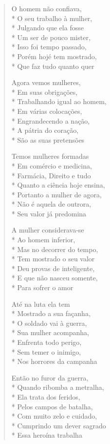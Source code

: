\begin{verse}
O homem não confiava,\\*
O seu trabalho à mulher,\\*
Julgando que ela fosse\\*
Um ser de pouco mister,\\*
Isso foi tempo passado,\\*
Porém hojé tem mostrado,\\*
Que faz tudo quanto quer

Agora vemos mulheres,\\*
Em suas obrigações,\\*
Trabalhando igual ao homem,\\*
Em várias colocações,\\*
Engrandecendo a nação,\\*
A pátria do coração,\\*
São as suas pretensões

Temos mulheres formadas\\*
Em comércio e medicina,\\*
Farmácia, Direito e tudo\\*
Quanto a ciência hoje ensina,\\*
Portanto a mulher de agora,\\*
Não é aquela de outrora,\\*
Seu valor já predomina

A mulher considerava-se\\*
Ao homem inferior,\\*
Mas no decorrer do tempo,\\*
Tem mostrado o seu valor\\*
Deu provas de inteligente,\\*
E que não nasceu somente,\\*
Para sofrer o amor

Até na luta ela tem\\*
Mostrado a sua façanha,\\*
O soldado vai à guerra,\\*
Sua mulher acompanha,\\*
Enfrenta todo perigo,\\*
Sem temer o inimigo,\\*
Nos horrores da campanha

Então no furor da guerra,\\*
Quando ribomba a metralha,\\*
Ela trata dos feridos,\\*
Pelos campos de batalha,\\*
Com muito zelo e cuidado,\\*
Cumprindo um dever sagrado\\*
Essa heroína trabalha


\end{verse}
